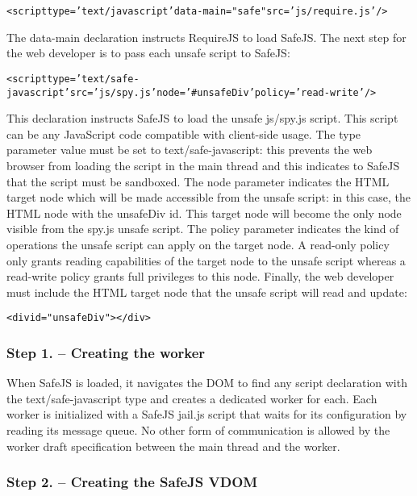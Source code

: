 \documentclass{article}
\newcommand{\ct}[1]{{\textsf{#1}}\xspace}
\newenvironment{code}
    {\begin{alltt}\sffamily}
    {\end{alltt}\normalsize}
\newcommand{\js}{JavaScript\xspace}
\newcommand{\safejs}{SafeJS\xspace}
\newcommand{\dom}{DOM\xspace}
\newcommand{\vdom}{\safejs VDOM\xspace}
\newcommand{\requirejs}{RequireJS\xspace}
\begin{document}
\begin{code}
<script type='text/javascript' data-main="safe" src='js/require.js' />
\end{code}

The \ct{data-main} declaration instructs \requirejs to load \safejs.
The next step for the web developer is to pass each unsafe script to
\safejs:

\begin{code}
<script type='text/safe-javascript' src='js/spy.js' node='#unsafeDiv' policy='read-write' />
\end{code}

This declaration instructs \safejs to load the unsafe \ct{js/spy.js}
script. This script can be any \js code compatible with client-side
usage. The \ct{type} parameter value must be set to
\ct{text/safe-javascript}: this prevents the web browser from loading
the script in the main thread and this indicates to \safejs that the
script must be sandboxed. The \ct{node} parameter indicates the HTML
target node which will be made accessible from the unsafe script: in
this case, the HTML node with the \ct{unsafeDiv} id. This target node
will become the only node visible from the \ct{spy.js} unsafe script.
The \ct{policy} parameter indicates the kind of operations the unsafe
script can apply on the target node. A \ct{read-only} policy only
grants reading capabilities of the target node to the unsafe script
whereas a \ct{read-write} policy grants full privileges to this node.
Finally, the web developer must include the HTML target node that the
unsafe script will read and update:

\begin{code}
  <div id="unsafeDiv"></div>
\end{code}

\subsubsection*{Step 1. -- Creating the worker}

When \safejs is loaded, it navigates the \dom to find any script
declaration with the \ct{text/safe-javascript} type and creates a
dedicated worker for each. Each worker is initialized with a \safejs{}
\ct{jail.js} script that waits for its configuration by reading its
message queue. No other form of communication is allowed by the worker
draft specification between the main thread and the
worker.

\subsubsection*{Step 2. -- Creating the \vdom}
\end{document}
